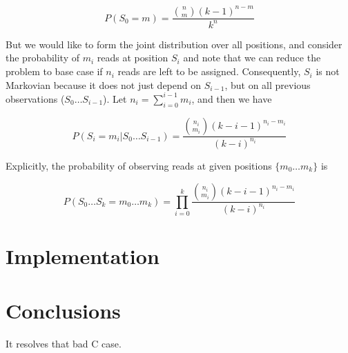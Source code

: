 \begin{equation}
  P(S_{0} = m) = \frac{{n \choose m} (k-1)^{n-m}}{k^{n}}
\end{equation}

But we would like to form the joint distribution over all positions,
and consider the probability of $m_{i}$ reads at position $S_{i}$ and note that
we can reduce the problem to base case if $n_{i}$ reads are left to be assigned.
Consequently, $S_{i}$ is not Markovian because it does not just depend on $S_{i-1}$,
but on all previous observations ($S_{0} \ldots S_{i-1}$).
Let $n_{i} = \sum_{i=0}^{i-1} m_{i}$, and then we have

\begin{equation}
  P(S_{i} = m_i | S_{0}\ldots S_{i-1}) = \frac{{n_i \choose m_i} (k-i-1)^{n_i-m_i}}{(k-i)^{n_i}}
\end{equation}

Explicitly, the probability of observing reads at given positions
$\{ m_{0} \ldots m_{k} \}$ is

\begin{equation}
  P(S_{0} \ldots S_{k} = m_{0} \ldots m_{k} ) =
    \prod_{i=0}^{k} \frac{{n_{i}\choose m_{i}} (k-i-1)^{n_{i}-m_{i}}}{(k-i)^{n_i}}
\end{equation}


\section{Implementation}

\section{Conclusions}

It resolves that bad C case.

\clearpage




\clearpage

\appendix


